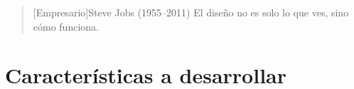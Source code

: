 
\begin{quotation}[Empresario]{Steve Jobs (1955--2011)}
El diseño no es solo lo que ves, sino cómo funciona.
\end{quotation}

\begin{abstract}
En este capítulo reflejaremos todos y cada uno de los costes que se han de reflejar a la hora de desarrollar el proyecto así como la relación de funcionalidades que se desarrollan con estos costes.
\end{abstract}

\section{Características a desarrollar}

